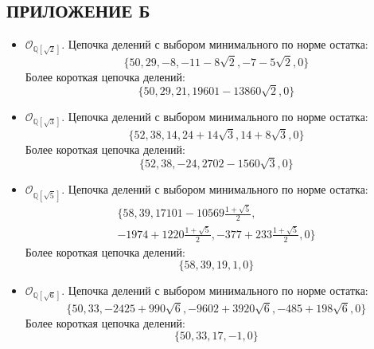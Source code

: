 \documentclass[_00_dissertation.tex]{subfiles}
\begin{document}
\onlyinsubfile{
    \renewcommand{\contentsname}{ОГЛАВЛЕНИЕ}
    \setcounter{tocdepth}{3}
    \tableofcontents
}

\newpage
\begin{center}
    \section*{ПРИЛОЖЕНИЕ Б}\label{section:Appendix_counterexample}
\end{center}

\begin{itemize}
    \item $\mathcal{O}_{\mathbb{Q}[\sqrt{2}]}$.
    Цепочка делений с выбором минимального по норме остатка:
    \begin{equation*}
        \{50, 29, -8, -11-8\sqrt{2}, -7-5\sqrt{2}, 0\}
    \end{equation*}
    Более короткая цепочка делений:
    \begin{equation*}
        \{50, 29, 21, 19601-13860\sqrt{2}, 0\}
    \end{equation*}

    \item $\mathcal{O}_{\mathbb{Q}[\sqrt{3}]}$.
    Цепочка делений с выбором минимального по норме остатка:
    \begin{equation*}
        \{52, 38, 14, 24+14\sqrt{3}, 14+8\sqrt{3}, 0\}
    \end{equation*}
    Более короткая цепочка делений:
    \begin{equation*}
        \{52, 38, -24, 2702-1560\sqrt{3}, 0\}
    \end{equation*}

    \item $\mathcal{O}_{\mathbb{Q}[\sqrt{5}]}$.
    Цепочка делений с выбором минимального по норме остатка:
    \begin{multline*}
        \{58, 39, 17101-10569\frac{1+\sqrt{5}}{2},\\
        -1974+1220\frac{1+\sqrt{5}}{2}, -377+233\frac{1+\sqrt{5}}{2}, 0\}
    \end{multline*}
    Более короткая цепочка делений:
    \begin{equation*}
        \{58, 39, 19, 1, 0\}
    \end{equation*}

    \item $\mathcal{O}_{\mathbb{Q}[\sqrt{6}]}$.
    Цепочка делений с выбором минимального по норме остатка:
    \begin{equation*}
        \{50, 33, -2425+990\sqrt{6}, -9602+3920\sqrt{6}, -485+198\sqrt{6}, 0\}
    \end{equation*}
    Более короткая цепочка делений:
    \begin{equation*}
        \{50, 33, 17, -1, 0\}
    \end{equation*}


\end{itemize}
\end{document}

